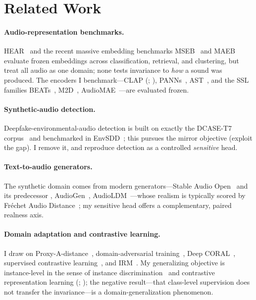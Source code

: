 \documentclass{article}
\begin{document}
\section{Related Work}
\paragraph{Audio-representation benchmarks.} HEAR~\citep{turian2022hear} and the recent massive
embedding benchmarks MSEB~\citep{heigold2026mseb} and MAEB~\citep{elassadi2026maeb} evaluate frozen
embeddings across classification, retrieval, and clustering, but treat all audio as one domain;
none tests invariance to \emph{how} a sound was produced. The encoders I benchmark---CLAP
(\citealp{wu2023clap}; \citealp{elizalde2023clap}), PANNs~\citep{kong2020panns},
AST~\citep{gong2021ast}, and the SSL families BEATs~\citep{chen2023beats},
M2D~\citep{niizumi2024m2d}, AudioMAE~\citep{huang2022audiomae}---are evaluated frozen.
\paragraph{Synthetic-audio detection.} Deepfake-environmental-audio detection is built on exactly
the DCASE-T7 corpus~\citep{ouajdi2024deepfake} and benchmarked in EnvSDD~\citep{yin2025envsdd}; this
pursues the mirror objective (exploit the gap). I remove it, and reproduce detection as a
controlled \emph{sensitive} head. \paragraph{Text-to-audio generators.} The synthetic domain comes
from modern generators---Stable Audio Open~\citep{evans2024stableaudioopen} and its predecessor
\citep{evans2024stableaudio}, AudioGen~\citep{kreuk2023audiogen},
AudioLDM~\citep{liu2023audioldm}---whose realism is typically scored by Fr\'echet Audio
Distance~\citep{kilgour2019fad}; my sensitive head offers a complementary, paired realness axis.
\paragraph{Domain adaptation and contrastive learning.} I draw on
Proxy-A-distance~\citep{bendavid2010theory}, domain-adversarial training~\citep{ganin2015dann},
Deep CORAL~\citep{sun2016coral}, supervised contrastive learning~\citep{khosla2020supcon}, and
IRM~\citep{arjovsky2019irm}. My generalizing objective is instance-level in the sense of instance
discrimination~\citep{wu2018instance} and contrastive representation learning
(\citealp{chen2020simclr}; \citealp{radford2021clip}); the negative result---that class-level
supervision does not transfer the invariance---is a domain-generalization phenomenon.
\end{document}
